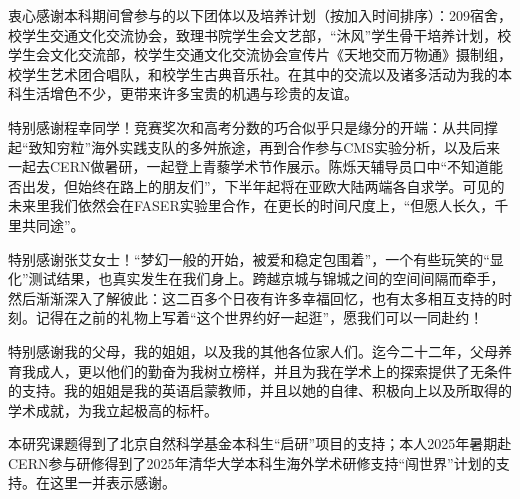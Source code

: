\begin{acknowledgements}
衷心感谢本科期间曾参与的以下团体以及培养计划（按加入时间排序）：209宿舍，校学生交通文化交流协会，致理书院学生会文艺部，“沐风”学生骨干培养计划，校学生会文化交流部，校学生交通文化交流协会宣传片《天地交而万物通》摄制组，校学生艺术团合唱队，和校学生古典音乐社。在其中的交流以及诸多活动为我的本科生活增色不少，更带来许多宝贵的机遇与珍贵的友谊。

特别感谢程幸同学！竞赛奖次和高考分数的巧合似乎只是缘分的开端：从共同撑起“致知穷粒”海外实践支队的多舛旅途，再到合作参与CMS实验分析，以及后来一起去CERN做暑研，一起登上青藜学术节作展示。陈烁天辅导员口中“不知道能否出发，但始终在路上的朋友们”，下半年起将在亚欧大陆两端各自求学。可见的未来里我们依然会在FASER实验里合作，在更长的时间尺度上，“但愿人长久，千里共同途”。

特别感谢张艾女士！“梦幻一般的开始，被爱和稳定包围着”，一个有些玩笑的“显化”测试结果，也真实发生在我们身上。跨越京城与锦城之间的空间间隔而牵手，然后渐渐深入了解彼此：这二百多个日夜有许多幸福回忆，也有太多相互支持的时刻。记得在之前的礼物上写着“这个世界约好一起逛”，愿我们可以一同赴约！

特别感谢我的父母，我的姐姐，以及我的其他各位家人们。迄今二十二年，父母养育我成人，更以他们的勤奋为我树立榜样，并且为我在学术上的探索提供了无条件的支持。我的姐姐是我的英语启蒙教师，并且以她的自律、积极向上以及所取得的学术成就，为我立起极高的标杆。

本研究课题得到了北京自然科学基金本科生“启研”项目的支持；本人2025年暑期赴CERN参与研修得到了2025年清华大学本科生海外学术研修支持“闯世界”计划的支持。在这里一并表示感谢。

\end{acknowledgements}
